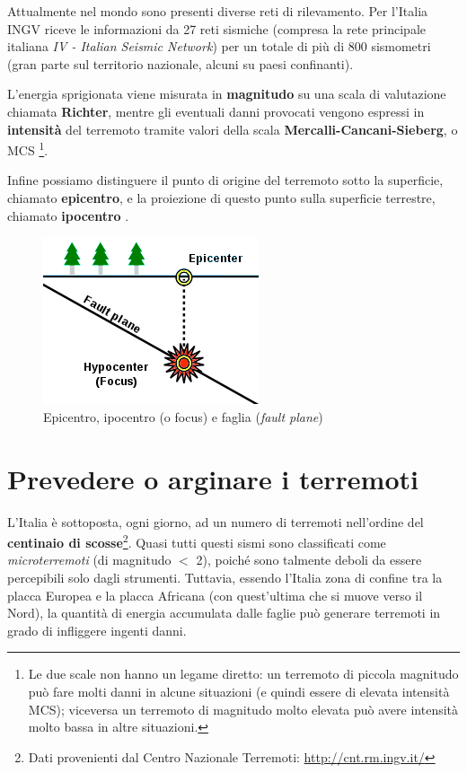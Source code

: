 \documentclass[a4paper,10pt]{memoir}
\begin{document}
Attualmente nel mondo sono presenti diverse reti di rilevamento. Per l'Italia INGV riceve le informazioni da 27 reti sismiche (compresa la rete principale italiana \textit{IV - Italian Seismic Network}) per un totale di più di 800 sismometri (gran parte sul territorio nazionale, alcuni su paesi confinanti).

L'energia sprigionata viene misurata in \textbf{magnitudo} su una scala di valutazione chiamata \textbf{Richter}, mentre gli eventuali danni provocati vengono espressi in \textbf{intensità} del terremoto tramite valori della scala \textbf{Mercalli-Cancani-Sieberg}, o MCS \footnote{Le due scale non hanno un legame diretto: un terremoto di piccola magnitudo può fare molti danni in alcune situazioni (e quindi essere di elevata intensità MCS); viceversa un terremoto di magnitudo molto elevata può avere intensità molto bassa in altre situazioni.}.

Infine possiamo distinguere il punto di origine del terremoto sotto la superficie, chiamato \textbf{epicentro}, e la proiezione di questo punto sulla superficie terrestre, chiamato \textbf{ipocentro} \cite{introdseismo}.

\begin{figure}[ht]
\caption{Epicentro, ipocentro (o focus) e faglia (\textit{fault plane})}
\label{fig:epiipo}
\centering
\includegraphics[scale=0.6]{introduzione/epicenter_diagram}
\end{figure}

\clearpage

\section{Prevedere o arginare i terremoti}

L'Italia è sottoposta, ogni giorno, ad un numero di terremoti nell'ordine del \textbf{centinaio di scosse}\footnote{Dati provenienti dal Centro Nazionale Terremoti: \url{http://cnt.rm.ingv.it/}}. Quasi tutti questi sismi sono classificati come \textit{microterremoti} (di magnitudo $<$ 2), poiché sono talmente deboli da essere percepibili solo dagli strumenti. Tuttavia, essendo l'Italia zona di confine tra la placca Europea e la placca Africana (con quest'ultima che si muove verso il Nord), la quantità di energia accumulata dalle faglie può generare terremoti in grado di infliggere ingenti danni.
\end{document}
